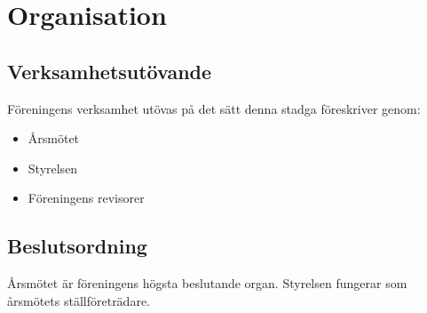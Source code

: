\section{Organisation}

\subsection{Verksamhetsutövande}
Föreningens verksamhet utövas på det sätt denna stadga föreskriver genom:  

\begin{itemize}
	\item Årsmötet
	\item Styrelsen
	\item Föreningens revisorer
\end{itemize}

\subsection{Beslutsordning}
Årsmötet är föreningens högsta beslutande organ. Styrelsen fungerar som årsmötets ställföreträdare.